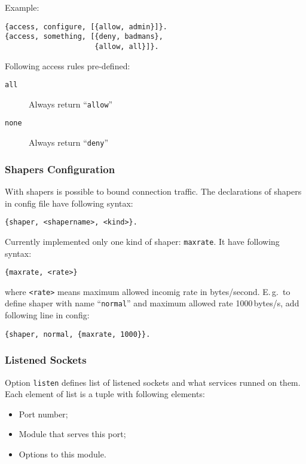 \documentclass[10pt]{article}
\begin{document}
Example:
\begin{verbatim}
{access, configure, [{allow, admin}]}.
{access, something, [{deny, badmans},
                     {allow, all}]}.
\end{verbatim}

Following access rules pre-defined:
\begin{description}
\item[\texttt{all}] Always return ``\texttt{allow}''
\item[\texttt{none}] Always return ``\texttt{deny}''
\end{description}



\subsubsection{Shapers Configuration}
\label{sec:configshaper}

With shapers is possible to bound connection traffic.  The declarations of
shapers in config file have following syntax:
\begin{verbatim}
{shaper, <shapername>, <kind>}.
\end{verbatim}
Currently implemented only one kind of shaper: \texttt{maxrate}.  It have
following syntax:
\begin{verbatim}
{maxrate, <rate>}
\end{verbatim}
where \texttt{<rate>} means maximum allowed incomig rate in bytes/second.
E.\,g.\ to define shaper with name ``\texttt{normal}'' and maximum allowed rate
1000\,bytes/s, add following line in config:
\begin{verbatim}
{shaper, normal, {maxrate, 1000}}.
\end{verbatim}




\subsubsection{Listened Sockets}
\label{sec:configlistened}

Option \texttt{listen} defines list of listened sockets and what services
runned on them.  Each element of list is a tuple with following elements:
\begin{itemize}
\item Port number;
\item Module that serves this port;
\item Options to this module.
\end{itemize}
\end{document}
